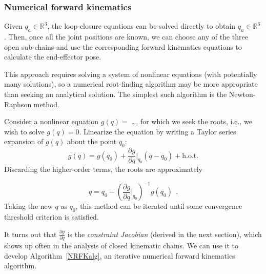 \documentclass{report}
\begin{document}
\subsubsection[Numerical forward kinematics]{Numerical forward kinematics}
Given $q_a \in \mathbb{R}^{3}$, the loop-closure equations can be solved directly to obtain $q_u \in \mathbb{R}^{6}$. Then, once all the joint positions are known, we can choose any of the three open sub-chains and use the corresponding forward kinematics equations to calculate the end-effector pose.

This approach requires solving a system of nonlinear equations (with potentially many solutions), so a numerical root-finding algorithm may be more appropriate than seeking an analytical solution. The simplest such algorithm is the Newton-Raphson method.

Consider a nonlinear equation $g(q) = \ $\dots, for which we seek the roots, i.e., we wish to solve $g(q) = 0$. Linearize the equation by writing a Taylor series expansion of $g(q)$ about the point $q_{0}$:
\begin{equation}
g(q) = g(q_{0}) + \frac{\partial g}{\partial q}\bigg|_{q_{0}}\left(q-q_{0} \right) + \text{h.o.t.}
\end{equation}
Discarding the higher-order terms, the roots are approximately

\begin{equation}
q = q_{0} - \left(\frac{\partial g}{\partial q}\bigg|_{q_{0}}\right)^{-1}g(q_{0})\ \ \text{.}
\end{equation}
Taking the new $q$ as $q_{0}$, this method can be iterated until some convergence threshold criterion is satisfied.

It turns out that $\frac{\partial g}{\partial q}$ is the \textit{constraint Jacobian} (derived in the next section), which shows up often in the analysis of closed kinematic chains. We can use it to develop Algorithm~\ref{NRFKalg}, an iterative numerical forward kinematics algorithm.
\end{document}
